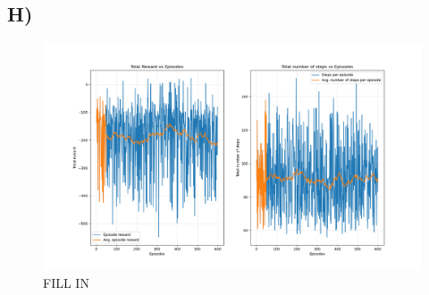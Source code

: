 \documentclass{article}
\begin{document}
\subsection*{H)}
\begin{figure}[H]
    \centering
    \includegraphics[width=1\textwidth]{Lab_2/problem1/images/randomAgent.png}
    \caption{\small FILL IN }
    \label{fig:randomAgent}
\end{figure}
\end{document}
